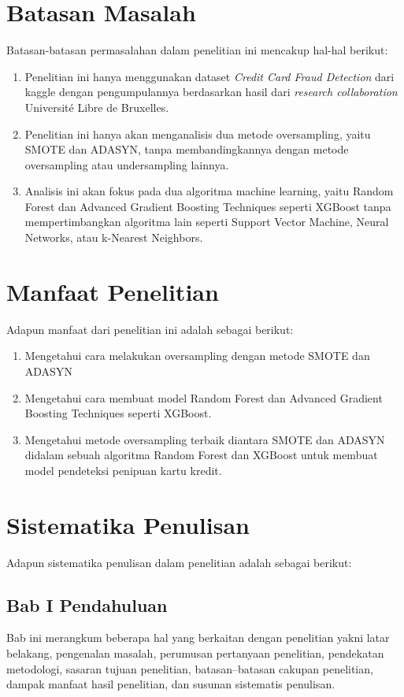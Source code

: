 \section{Batasan Masalah} \label{I.Batasan}
Batasan-batasan permasalahan dalam penelitian ini mencakup hal-hal berikut: 
\begin{enumerate}[noitemsep]
    \item Penelitian ini hanya menggunakan  dataset \textit{Credit Card Fraud Detection} dari kaggle dengan pengumpulannya berdasarkan hasil dari \textit{research collaboration} Université Libre de Bruxelles.
    \item Penelitian ini hanya akan menganalisis dua metode oversampling, yaitu SMOTE dan ADASYN, tanpa membandingkannya dengan metode oversampling atau undersampling lainnya.
    \item Analisis ini akan fokus pada dua algoritma machine learning, yaitu Random Forest dan Advanced Gradient Boosting Techniques seperti XGBoost tanpa mempertimbangkan algoritma lain seperti Support Vector Machine, Neural Networks, atau k-Nearest Neighbors.
\end{enumerate}

\section{Manfaat Penelitian} \label{I.Manfaat}
Adapun manfaat dari penelitian ini adalah sebagai berikut:
\begin{enumerate}[noitemsep]
    \item Mengetahui cara melakukan oversampling dengan metode SMOTE dan ADASYN
    \item Mengetahui cara membuat model Random Forest dan Advanced Gradient Boosting Techniques seperti XGBoost.
    \item Mengetahui metode oversampling terbaik diantara SMOTE dan ADASYN didalam sebuah algoritma Random Forest dan XGBoost untuk membuat model pendeteksi penipuan kartu kredit.
\end{enumerate}

\section{Sistematika Penulisan} \label{I.Sistematika}
Adapun sistematika penulisan dalam penelitian adalah sebagai berikut:
\subsection{Bab I Pendahuluan}
Bab ini merangkum beberapa hal yang berkaitan dengan penelitian yakni latar belakang, pengenalan masalah, perumusan pertanyaan penelitian, pendekatan metodologi, sasaran tujuan penelitian, batasan–batasan cakupan penelitian, dampak manfaat hasil penelitian, dan susunan sistematis penulisan.
